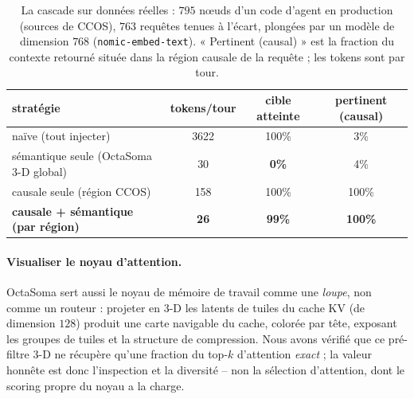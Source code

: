 \documentclass[11pt]{article}
\begin{document}
\begin{table}[t]
\centering
\caption{La cascade sur données réelles : $795$ n\oe{}uds d'un code d'agent en
production (sources de CCOS), $763$ requêtes tenues à l'écart, plongées par un modèle
de dimension $768$ (\texttt{nomic-embed-text}). « Pertinent (causal) » est la
fraction du contexte retourné située dans la région causale de la requête ; les
tokens sont par tour.}
\label{tab:cascade}
\begin{tabular}{lccc}
\toprule
stratégie & tokens/tour & cible atteinte & pertinent (causal) \\
\midrule
naïve (tout injecter)                      & 3622        & 100\%         & 3\%            \\
sémantique seule (OctaSoma 3-D global)     & 30          & \textbf{0\%}  & 4\%            \\
causale seule (région CCOS)                & 158         & 100\%         & 100\%          \\
\textbf{causale + sémantique (par région)} & \textbf{26} & \textbf{99\%} & \textbf{100\%} \\
\bottomrule
\end{tabular}
\end{table}

\paragraph{Visualiser le noyau d'attention.} OctaSoma sert aussi le noyau de mémoire
de travail comme une \emph{loupe}, non comme un routeur : projeter en 3-D les latents
de tuiles du cache KV (de dimension $128$) produit une carte navigable du cache,
colorée par tête, exposant les groupes de tuiles et la structure de compression. Nous
avons vérifié que ce pré-filtre 3-D ne récupère qu'une fraction du top-$k$
d'attention \emph{exact} ; la valeur honnête est donc l'inspection et la diversité --
non la sélection d'attention, dont le scoring propre du noyau a la charge.
\end{document}
